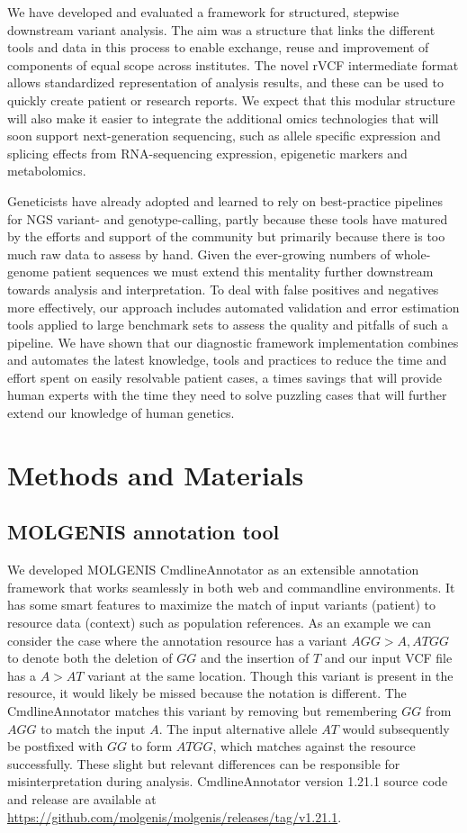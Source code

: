 We have developed and evaluated a framework for structured, stepwise downstream variant analysis.
The aim was a structure that links the different tools and data in this process to enable exchange, reuse and improvement of components of equal scope across institutes.
The novel rVCF intermediate format allows standardized representation of analysis results, and these can be used to quickly create patient or research reports.
We expect that this modular structure will also make it easier to integrate the additional omics technologies that will soon support next-generation sequencing, such as allele specific expression and splicing effects from RNA-sequencing expression, epigenetic markers and metabolomics.

Geneticists have already adopted and learned to rely on best-practice pipelines for NGS variant- and genotype-calling, partly because these tools have matured by the efforts and support of the community but primarily because there is too much raw data to assess by hand.
Given the ever-growing numbers of whole-genome patient sequences we must extend this mentality further downstream towards analysis and interpretation.
To deal with false positives and negatives more effectively, our approach includes automated validation and error estimation tools applied to large benchmark sets to assess the quality and pitfalls of such a pipeline.
We have shown that our diagnostic framework implementation combines and automates the latest knowledge, tools and practices to reduce the time and effort spent on easily resolvable patient cases, a  times savings that will provide human experts with the time they need to solve puzzling cases that will further extend our knowledge of human genetics.


\section{Methods and Materials}

\subsection{MOLGENIS annotation tool}
We developed MOLGENIS CmdlineAnnotator as an extensible annotation framework that works seamlessly in both web and commandline environments.
It has some smart features to maximize the match of input variants (patient) to resource data (context) such as population references.
As an example we can consider the case where the annotation resource has a variant $AGG>A,ATGG$ to denote both the deletion of $GG$ and the insertion of $T$ and our input VCF file has a $A>AT$ variant at the same location.
Though this variant is present in the resource, it would likely be missed because the notation is different.
The CmdlineAnnotator matches this variant by removing but remembering $GG$ from $AGG$ to match the input $A$.
The input alternative allele $AT$ would subsequently be postfixed with $GG$ to form $ATGG$, which matches against the resource successfully.
These slight but relevant differences can be responsible for misinterpretation during analysis.
CmdlineAnnotator version 1.21.1 source code and release are available at \url{https://github.com/molgenis/molgenis/releases/tag/v1.21.1}.

